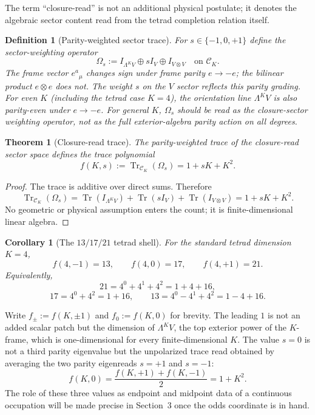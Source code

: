 \documentclass[10pt]{article}
\newtheorem{theorem}{Theorem}
\newtheorem{corollary}{Corollary}
\newtheorem{definition}{Definition}
\DeclareMathOperator{\Tr}{Tr}
\begin{document}
The term ``closure-read'' is not an additional physical postulate; it denotes
the algebraic sector content read from the tetrad completion relation itself.

\begin{definition}[Parity-weighted sector trace]
For $s\in\{-1,0,+1\}$ define the sector-weighting operator
\[
        \Omega_s:=I_{\Lambda^K V}\oplus sI_V\oplus I_{V\otimes V}
        \quad\text{on }\mathcal C_K.
\]
The frame vector $e^a{}_\mu$ changes sign under frame parity $e\to-e$; the
bilinear product $e\otimes e$ does not.  The weight $s$ on the $V$ sector
reflects this parity grading.  For even $K$ (including the tetrad case $K=4$),
the orientation line $\Lambda^K V$ is also parity-even under $e\to-e$.  For
general $K$, $\Omega_s$ should be read as the closure-sector weighting
operator, not as the full exterior-algebra parity action on all degrees.
\end{definition}

\begin{theorem}[Closure-read trace]
The parity-weighted trace of the closure-read sector space defines the
trace polynomial
\[
        f(K,s):=\Tr_{\mathcal C_K}(\Omega_s)=1+sK+K^2.
\]
\end{theorem}

\begin{proof}
The trace is additive over direct sums. Therefore
\[
\Tr_{\mathcal C_K}(\Omega_s)
=\Tr(I_{\Lambda^K V})+\Tr(sI_V)+\Tr(I_{V\otimes V})
=1+sK+K^2.
\]
No geometric or physical assumption enters the count; it is finite-dimensional
linear algebra.
\end{proof}

\begin{corollary}[The $13/17/21$ tetrad shell]
For the standard tetrad dimension $K=4$,
\[
        f(4,-1)=13,
        \qquad
        f(4,0)=17,
        \qquad
        f(4,+1)=21.
\]
Equivalently,
\[
        21=4^0+4^1+4^2=1+4+16,
\]
\[
        17=4^0+4^2=1+16,
        \qquad
        13=4^0-4^1+4^2=1-4+16.
\]
\end{corollary}

Write $f_\pm:=f(K,\pm1)$ and $f_0:=f(K,0)$ for brevity.
The leading $1$ is not an added scalar patch but the dimension of
$\Lambda^K V$, the top exterior power of the $K$-frame, which is
one-dimensional for every finite-dimensional $K$.
The value $s=0$ is not a third parity eigenvalue but the unpolarized trace
read obtained by averaging the two parity eigenreads $s=+1$ and $s=-1$:
\[
        f(K,0)=\frac{f(K,+1)+f(K,-1)}2=1+K^2.
\]
The role of these three values as endpoint and midpoint data of a continuous occupation
will be made precise in Section~3 once the odds coordinate is in hand.
\end{document}
